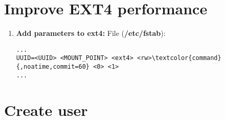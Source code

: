 \documentclass[10pt, a4paper, onecolumn, openany]{book} %
\begin{document}
\section{Improve EXT4 performance}
\begin{enumerate}
    \item \textbf{Add parameters to ext4:}
\newline File (\textbf{\textcolor{file}{/etc/fstab}}):
\begin{Verbatim}[commandchars=\\\{\}]
...
UUID=<UUID> <MOUNT_POINT> <ext4> <rw>\textcolor{command}{,noatime,commit=60} <0> <1>
...
\end{Verbatim}
\end{enumerate}
\section{Create user}
\end{document}
